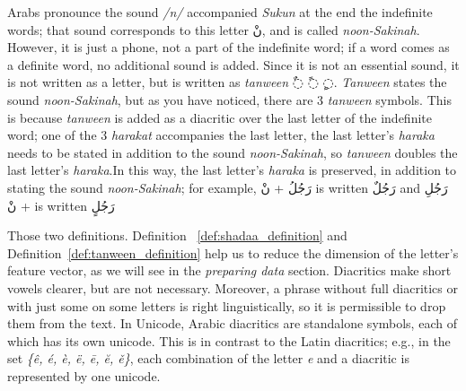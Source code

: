 Arabs pronounce the sound \textit{/n/} accompanied \textit{Sukun} at the end the indefinite words; that sound corresponds to this letter \textarabic{نْ}, and is called \textit{noon-Sakinah}. However, it is just a phone, not a part of the indefinite word; if a word comes as a definite word, no additional sound is added. Since it is not an essential sound, it is not written as a letter, but is written as \textit{tanween} \textarabic{◌ٌ ◌ً ◌ٍ}. \textit{Tanween} states the sound \textit{noon-Sakinah}, but as you have noticed, there are 3 \textit{tanween} symbols. This is because  \textit{tanween} is added as a diacritic over the last letter of the indefinite word; one of the 3 \textit{harakat} accompanies the last letter, the last letter's \textit{haraka} needs to be stated in addition to the sound \textit{noon-Sakinah}, so \textit{tanween} doubles the last letter's \textit{haraka}.In this way, the last letter's \textit{haraka} is preserved, in addition to stating the sound \textit{noon-Sakinah}; for example, \textarabic{رَجُلُ + نْ} is written
\textarabic{رَجُلٌ} and  \textarabic{رَجُلِ + نْ} is written \textarabic{رَجُلٍ}

Those two definitions. Definition ~\ref{def:shadaa_definition} and
Definition~\ref{def:tanween_definition} help us to reduce the dimension of the letter’s feature vector, as we will see in the \textit{preparing data} section. Diacritics make short vowels clearer, but are not necessary. Moreover, a phrase without full diacritics or with just some on some letters is right linguistically, so it is permissible to drop them from the text. In Unicode, Arabic diacritics are standalone symbols, each of which has its own unicode. This is in contrast to the Latin diacritics; e.g., in the set \textit{\{ê, é, è, ë, ē, ĕ,
  ě\}}, each combination of the letter \textit{e} and a diacritic is represented by one unicode.

